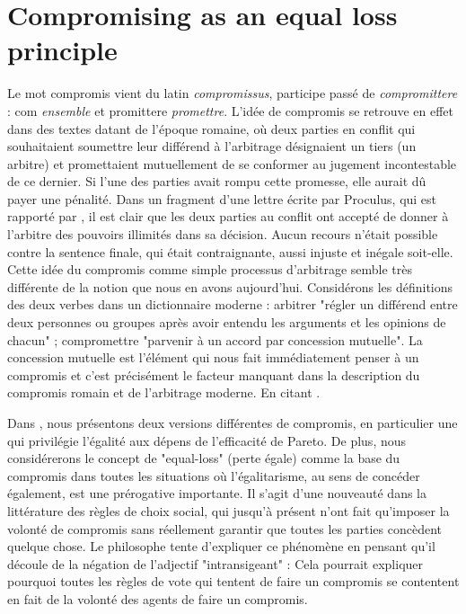 \newpage
\section{Compromising as an equal loss principle}
	Le mot compromis vient du latin \textit{compromissus}, participe passé de \textit{compromittere} : com \textit{ensemble} et promittere \textit{promettre}.
	L'idée de compromis se retrouve en effet dans des textes datant de l'époque romaine, où deux parties en conflit qui souhaitaient soumettre leur différend à l'arbitrage désignaient un tiers (un arbitre) et promettaient mutuellement de se conformer au jugement incontestable de ce dernier. Si l'une des parties avait rompu cette promesse, elle aurait dû payer une pénalité.
	Dans un fragment d'une lettre écrite par Proculus, qui est rapporté par \citet [p.529]{Zimmermann1996}, il est clair que les deux parties au conflit ont accepté de donner à l'arbitre des pouvoirs illimités dans sa décision. Aucun recours n'était possible contre la sentence finale, qui était contraignante, aussi injuste et inégale soit-elle. Cette idée du compromis comme simple processus d'arbitrage semble très différente de la notion que nous en avons aujourd'hui. Considérons les définitions des deux verbes dans un dictionnaire moderne : arbitrer "régler un différend entre deux personnes ou groupes après avoir entendu les arguments et les opinions de chacun" ; compromettre "parvenir à un accord par concession mutuelle".
	La concession mutuelle est l'élément qui nous fait immédiatement penser à un compromis et c'est précisément le facteur manquant dans la description du compromis romain et de l'arbitrage moderne. En citant \citet{Braybrooke1982} .
	
	Dans , nous présentons deux versions différentes de compromis, en particulier une qui privilégie l'égalité aux dépens de l'efficacité de Pareto. De plus, nous considérerons le concept de "equal-loss" (perte égale) \citep{Chun1988, Chun1991} comme la base du compromis dans toutes les situations où l'égalitarisme, au sens de concéder également, est une prérogative importante.
	Il s'agit d'une nouveauté dans la littérature des règles de choix social, qui jusqu'à présent n'ont fait qu'imposer la volonté de compromis sans réellement garantir que toutes les parties concèdent quelque chose.
	Le philosophe \citet{Day1989} tente d'expliquer ce phénomène en pensant qu'il découle de la négation de l'adjectif "intransigeant" : 
	\textit{}
	Cela pourrait expliquer pourquoi toutes les règles de vote qui tentent de faire un compromis se contentent en fait de la volonté des agents de faire un compromis. 
	
